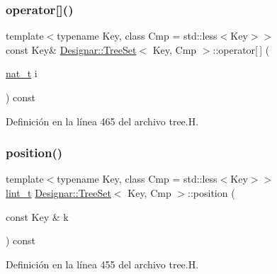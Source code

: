 \subsubsection{\texorpdfstring{operator[]()}{operator[]()}\hspace{0.1cm}{\footnotesize\ttfamily [2/2]}}
{\footnotesize\ttfamily template$<$typename Key, class Cmp = std\+::less$<$\+Key$>$$>$ \\
const Key\& \hyperlink{class_designar_1_1_tree_set}{Designar\+::\+Tree\+Set}$<$ Key, Cmp $>$\+::operator\mbox{[}$\,$\mbox{]} (\begin{DoxyParamCaption}\item[{\hyperlink{namespace_designar_aa72662848b9f4815e7bf31a7cf3e33d1}{nat\+\_\+t}}]{i }\end{DoxyParamCaption}) const\hspace{0.3cm}{\ttfamily [inline]}}



Definición en la línea 465 del archivo tree.\+H.

\mbox{\label{class_designar_1_1_tree_set_a3d10471f0d45ebbf63904fcb57f0ef5d}} 
\subsubsection{\texorpdfstring{position()}{position()}}
{\footnotesize\ttfamily template$<$typename Key, class Cmp = std\+::less$<$\+Key$>$$>$ \\
\hyperlink{namespace_designar_a9d113d66a39e82b73727c72cd3a52f73}{lint\+\_\+t} \hyperlink{class_designar_1_1_tree_set}{Designar\+::\+Tree\+Set}$<$ Key, Cmp $>$\+::position (\begin{DoxyParamCaption}\item[{const Key \&}]{k }\end{DoxyParamCaption}) const\hspace{0.3cm}{\ttfamily [inline]}}



Definición en la línea 455 del archivo tree.\+H.

\mbox{\label{class_designar_1_1_tree_set_aa0a8a4c41fe3c495759d555f2de08661}} 
